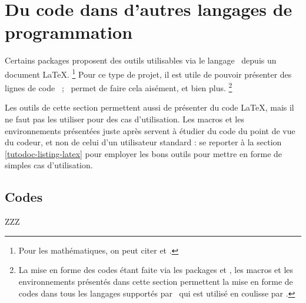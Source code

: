 \documentclass{tutodoc}
\begin{document}
\section{Du code dans d'autres langages de programmation}

Certains packages proposent des outils utilisables via le langage \lua\ depuis un document \LaTeX.%
\footnote{
	Pour les mathématiques, on peut citer  et .
}
Pour ce type de projet, il est utile de pouvoir présenter des lignes de code \lua\ ; \thisproj\ permet de faire cela aisément, et bien plus.%
\footnote{
    La mise en forme des codes étant faite via les packages  et , les macros et les environnements présentés dans cette section permettent la mise en forme de codes dans tous les langages supportés par \pygmentsREF\ qui est utilisé en coulisse par .
}


\begin{tdoccaut}
	Les outils de cette section permettent aussi de présenter du code \LaTeX, mais il ne faut pas les utiliser pour des cas d'utilisation.
	Les macros et les environnements présentées juste après servent à étudier du code du point de vue du codeur, et non de celui d'un utilisateur standard : se reporter à la section \ref{tutodoc-listing-latex} pour employer les bons outils pour mettre en forme de simples cas d'utilisation.
\end{tdoccaut}



\subsection{Codes }

ZZZ
\end{document}
